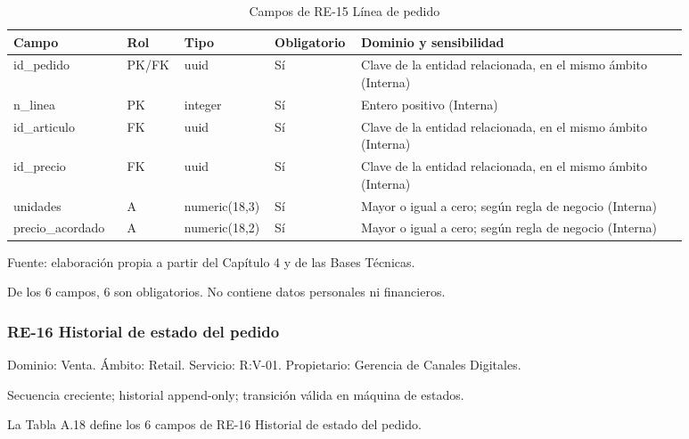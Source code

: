 \documentclass[11pt]{article}
\begin{document}
\begin{table}[htbp]
\caption{Campos de RE-15 Línea de pedido}\label{tab:d_re15}
\centering
\begin{tabular}{@{}p{0.167\linewidth}p{0.070\linewidth}p{0.079\linewidth}p{0.097\linewidth}p{0.465\linewidth}@{}}
\toprule Campo & Rol & Tipo & Obligatorio & Dominio y sensibilidad \\
\midrule
id\_pedido & PK/FK & uuid & Sí & Clave de la entidad relacionada, en el mismo ámbito (Interna) \\
n\_linea & PK & integer & Sí & Entero positivo (Interna) \\
id\_articulo & FK & uuid & Sí & Clave de la entidad relacionada, en el mismo ámbito (Interna) \\
id\_precio & FK & uuid & Sí & Clave de la entidad relacionada, en el mismo ámbito (Interna) \\
unidades & A & numeric(18,3) & Sí & Mayor o igual a cero; según regla de negocio (Interna) \\
precio\_acordado & A & numeric(18,2) & Sí & Mayor o igual a cero; según regla de negocio (Interna) \\
\bottomrule
\end{tabular}
\par\smallskip
{\raggedright Fuente: elaboración propia a partir del Capítulo 4 y de las Bases Técnicas.\par}
\end{table}


De los 6 campos, 6 son obligatorios. No contiene datos personales ni financieros.

\subsubsection{RE-16 Historial de estado del pedido}

Dominio: Venta. Ámbito: Retail. Servicio: R:V-01. Propietario: Gerencia de Canales Digitales.

Secuencia creciente; historial append-only; transición válida en máquina de estados.

La Tabla A.18 define los 6 campos de RE-16 Historial de estado del pedido.

\clearpage
\end{document}
